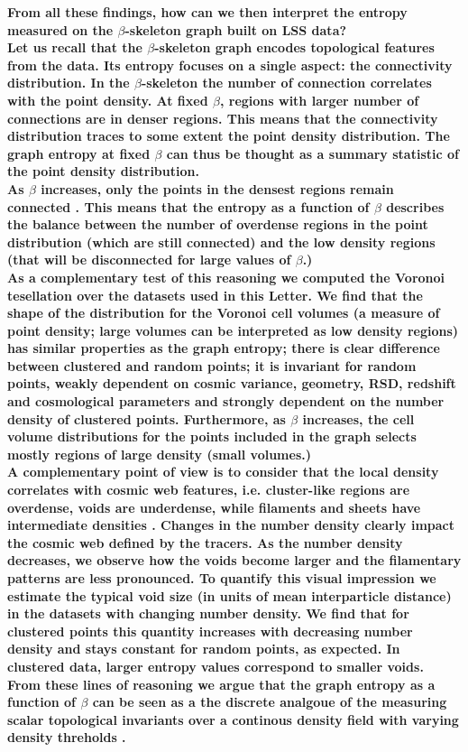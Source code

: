 \documentclass[fleqn,usenatbib]{mnras}
\begin{document}
\textbf{From all these findings, how can we then interpret the entropy measured on the
  $\beta$-skeleton graph built on LSS data?\\
\indent
Let us recall that the $\beta$-skeleton graph encodes topological
features from the data.
  Its entropy focuses on a single aspect: the connectivity distribution.
  In the $\beta$-skeleton the number of connection correlates with the
  point density.
  At fixed $\beta$, regions with larger number of connections are in 
  denser regions.
  This means that the connectivity distribution traces to some extent
  the point density distribution.
  The graph entropy at fixed $\beta$ can thus be thought as a summary
  statistic of the point density distribution.\\
\indent
  As $\beta$ increases, only the points in the densest regions remain
  connected \citep{2019MNRAS.485.5276F}.
  This means that the entropy as a function of $\beta$ describes the
  balance between the number of 
  overdense regions in the point distribution (which are still
  connected) and the low density regions (that will be disconnected
  for large values of $\beta$.)\\
\indent
As a complementary test of this reasoning we computed the Voronoi
tesellation over the datasets used in this Letter. 
We find that the shape of the distribution for the Voronoi cell volumes (a measure
of point density; large volumes can be interpreted as low density regions) 
has similar properties as the graph entropy; there is clear difference between clustered and random points; it is invariant for random points,
weakly dependent on cosmic variance, geometry, RSD, redshift and
cosmological parameters and strongly dependent on the number density
of clustered points.
Furthermore, as $\beta$ increases, the cell volume distributions for the points included in
the graph selects mostly regions of large density (small volumes.)\\
\indent
A complementary point of view is to consider that the local density
correlates with cosmic web features,
i.e. cluster-like regions are overdense, voids are underdense, while filaments and sheets have
 intermediate densities \citep{2018MNRAS.473.1195L}. 
 Changes in the number density clearly impact the cosmic web defined by the tracers.
  As the number density decreases, we observe how the voids become
  larger and the filamentary patterns are less pronounced.  
  To quantify this visual impression we estimate the typical void size
  (in units of mean interparticle distance)
  in the datasets with changing number density.  
  We find that for clustered points this quantity increases with
  decreasing number density and stays constant for random points,
  as expected.
  In clustered data, larger entropy values correspond to smaller voids.\\
\indent
From these lines of reasoning we argue that the graph entropy as a
  function of $\beta$ can be seen as a the discrete analgoue of
  the measuring scalar topological invariants 
  over a continous density field with varying density threholds \citep{2013JKAS...46..125P}.}
\end{document}
